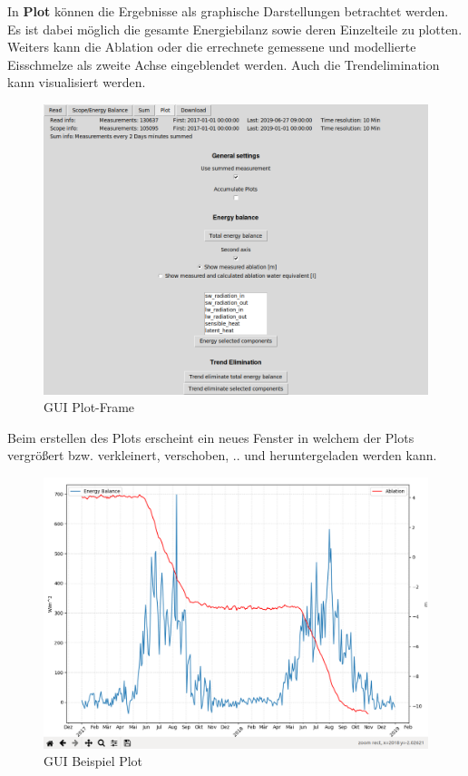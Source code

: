 \documentclass[12pt,a4paper]{article}
\begin{document}
In \textbf{Plot} können die Ergebnisse als graphische Darstellungen betrachtet werden. Es ist dabei möglich die gesamte Energiebilanz sowie deren Einzelteile zu plotten. Weiters kann die Ablation oder die errechnete gemessene und modellierte Eisschmelze als zweite Achse eingeblendet werden. Auch die Trendelimination kann visualisiert werden.

\begin{figure}[H]
\centering
\includegraphics[width=1\textwidth]{pictures/GUI/Plot_Frame.png}
\caption{GUI Plot-Frame}
\label{fig:GUI Plot-Frame}
\end{figure}

Beim erstellen des Plots erscheint ein neues Fenster in welchem der Plots vergrößert bzw. verkleinert, verschoben, .. und heruntergeladen werden kann.

\begin{figure}[H]
\centering
\includegraphics[width=1\textwidth]{pictures/GUI/Sample_Plot.png}
\caption{GUI Beispiel Plot}
\label{fig:GUI Beispiel Plot}
\end{figure}
\end{document}
